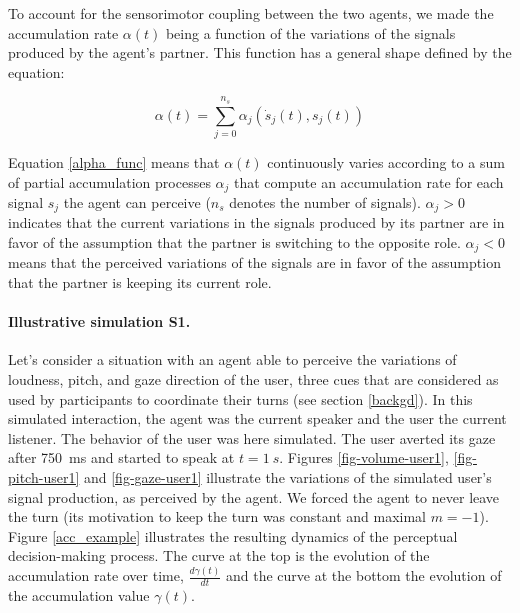 To account for the sensorimotor coupling between the two agents, we made the accumulation rate $\alpha(t)$ being a function of the variations of the signals produced by the agent's partner. This function has a general shape defined by the equation: 

\begin{equation}
  \alpha(t) = \sum_{j=0}^{n_{s}} \alpha_{j}(\dot{s}_j(t),s_j(t))
  \label{alpha_func}
\end{equation}

Equation \ref{alpha_func} means that $\alpha(t)$ continuously varies according to a sum of partial accumulation processes $\alpha_{j}$ that compute an accumulation rate for each signal $s_j$ the agent can perceive ($n_s$ denotes the number of signals). %
$\alpha_{j}>0$ indicates that the current variations in the signals produced by its partner are in favor of the assumption that the partner is switching to  the opposite role.
$\alpha_{j}<0$  means that the perceived variations of the signals are in favor of the assumption that the partner is keeping its current role. 

\paragraph{Illustrative simulation S1.}%
Let's consider a situation with an agent able to perceive the variations of loudness, pitch, and gaze direction of the user, three cues that are considered as used by participants to coordinate their turns (see section \ref{backgd}). 
In this simulated interaction, the agent was the current speaker and the user the current listener. The behavior of the user was here simulated.
The user averted its gaze after 750~ms and started to speak at $t=1~s$. %
Figures \ref{fig-volume-user1}, \ref{fig-pitch-user1} and \ref{fig-gaze-user1} illustrate the variations of the simulated user's signal production, as perceived by the agent. 
We forced the agent to never leave the turn (its motivation to keep the turn was constant and maximal $m = -1$).
Figure \ref{acc_example} illustrates the resulting dynamics of the perceptual decision-making process. 
The curve at the top is the evolution of the accumulation rate over time, $\frac{d\gamma(t)}{dt}$ and the curve at the bottom the evolution of the accumulation value $\gamma(t)$. 

